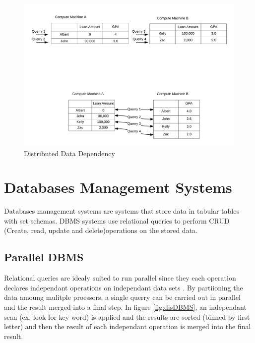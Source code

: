 \documentclass[10pt,twocolumn]{IEEEtran11}
\begin{document}
\begin{figure}[h]
\centering
\includegraphics[scale=0.12]{images/parallelComputation.png}
\caption{Distributed Data Dependency}
\label{fig:distDataDependency}
\end{figure}


\section{Databases Management Systems}

Databases management systems are systems that store data in tabular tables with set schemas.  DBMS systems use relational queries to perform CRUD 
(Create, read, update and delete)operations on the stored data.  

\subsection{Parallel DBMS}

Relational queries are idealy suited to run parallel since they
each operation declares independant operations on independant data sets \cite{dewitt1992parallel}.  By partiioning the data amoung mulitple proessors, a single querry can be carried out in parallel and the result merged into a final step.  In figure \ref{fig:disDBMS}, an independant scan (ex, look for key word) is applied and the results are sorted (binned by first letter) and then the result of each independant operation is merged into the final result.
\end{document}
